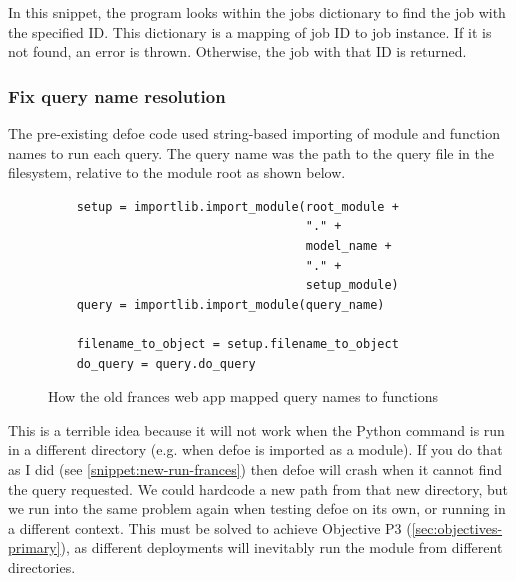 \documentclass[12pt, letterpaper]{article}
\begin{document}
\begin{flushleft}
In this snippet, the program looks within the jobs dictionary to find the job with the specified ID. This dictionary is a mapping of job ID to job instance. If it is not found, an error is thrown. Otherwise, the job with that ID is returned.
\end{flushleft}

\subsubsection{Fix query name resolution}\label{sec:query-name-res}

\begin{flushleft}
The pre-existing defoe code used string-based importing of module and function names to run each query. The query name was the path to the query file in the filesystem, relative to the module root as shown below.
\end{flushleft}

\begin{flushleft}
\begin{figure}[H]
\begin{verbatim}
    setup = importlib.import_module(root_module +
                                    "." +
                                    model_name +
                                    "." +
                                    setup_module)
    query = importlib.import_module(query_name)
   
    filename_to_object = setup.filename_to_object
    do_query = query.do_query
\end{verbatim}
\caption{How the old frances web app mapped query names to functions}
\end{figure}
\end{flushleft}

\begin{flushleft}
This is a terrible idea because it will not work when the Python command is run in a different directory (e.g. when defoe is imported as a module). If you do that as I did (see \ref{snippet:new-run-frances}) then defoe will crash when it cannot find the query requested. We could hardcode a new path from that new directory, but we run into the same problem again when testing defoe on its own, or running in a different context. This must be solved to achieve Objective P3 (\ref{sec:objectives-primary}), as different deployments will inevitably run the module from different directories.
\end{flushleft}
\end{document}
